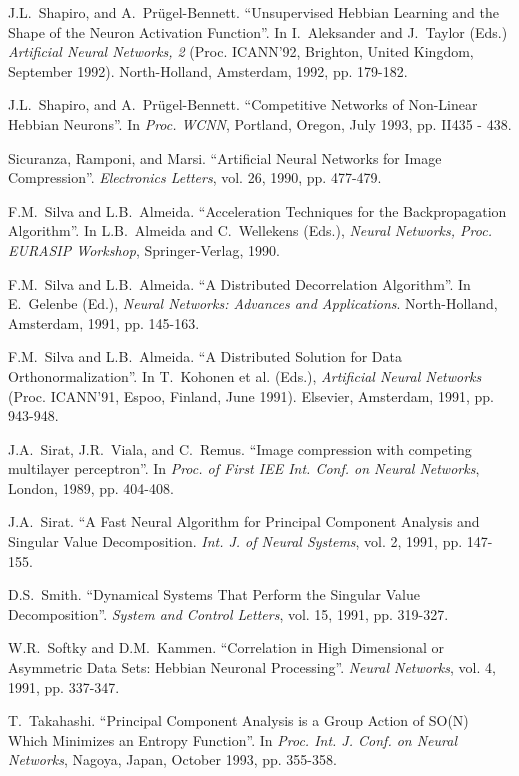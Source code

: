 \begin{thebibliography}{999}
J.L.~Shapiro, and A.~Pr\"ugel-Bennett.
``Unsupervised Hebbian Learning and the Shape of the Neuron
Activation Function''.
In I.~Aleksander and J.~Taylor (Eds.) {\em Artificial Neural
Networks, 2} (Proc. ICANN'92, Brighton, United Kingdom, September 1992).
North-Holland, Amsterdam, 1992, pp. 179-182.

J.L.~Shapiro, and A.~Pr\"ugel-Bennett.
``Competitive Networks of Non-Linear Hebbian Neurons''. In {\em Proc.
WCNN}, Portland, Oregon, July 1993, pp. II435 - 438.

Sicuranza, Ramponi, and Marsi.
``Artificial Neural Networks for Image Compression''.
{\em Electronics Letters}, vol. 26, 1990, pp. 477-479.

F.M.~Silva and L.B.~Almeida.
``Acceleration Techniques for the Backpropagation Algorithm''.
In  L.B.~Almeida and C.~Wellekens (Eds.), {\em Neural Networks, Proc.
EURASIP Workshop}, Springer-Verlag, 1990.

F.M.~Silva and L.B.~Almeida.
``A Distributed Decorrelation Algorithm''.
In E.~Gelenbe (Ed.), {\em Neural Networks: Advances and Applications}. 
North-Holland, Amsterdam, 1991, pp. 145-163.

F.M.~Silva and L.B.~Almeida.
``A Distributed Solution for Data Orthonormalization''.
In T.~Kohonen et al. (Eds.), {\em Artificial Neural Networks} (Proc.
ICANN'91, Espoo, Finland, June 1991). Elsevier, Amsterdam, 1991,
pp. 943-948.

J.A.~Sirat, J.R.~Viala, and C.~Remus.
``Image compression with competing multilayer perceptron''.
In {\em Proc. of First IEE Int. Conf. on Neural Networks},
London, 1989, pp. 404-408.

J.A.~Sirat.
``A Fast Neural Algorithm for Principal Component
Analysis and Singular Value Decomposition.
{\em Int. J. of Neural Systems}, vol. 2, 1991, pp. 147-155. 

D.S.~Smith.
``Dynamical Systems That Perform the Singular Value Decomposition''.
{\em System and Control Letters}, vol. 15, 1991, pp. 319-327.

W.R.~Softky and D.M.~Kammen.
``Correlation in High Dimensional or Asymmetric Data Sets: 
Hebbian Neuronal Processing''.
{\em Neural Networks}, vol. 4, 1991, pp. 337-347.

T.~Takahashi.
``Principal Component Analysis is a Group Action of SO(N) Which Minimizes
an Entropy Function''.
In {\em Proc. Int. J. Conf. on Neural Networks}, Nagoya, Japan,
October 1993, pp. 355-358.


\end{thebibliography}
